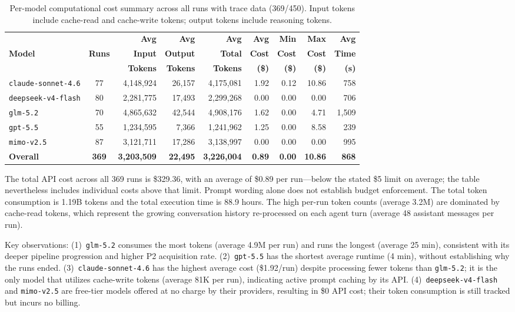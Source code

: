 \begin{table}[t]
\centering

\footnotesize
\renewcommand{\arraystretch}{1.1}
\setlength{\tabcolsep}{4pt}
\begin{tabular}{l c r r r r r r r}
\toprule
 & & \textbf{Avg} & \textbf{Avg} & \textbf{Avg} & \textbf{Avg} & \textbf{Min} & \textbf{Max} & \textbf{Avg} \\
\textbf{Model} & \textbf{Runs} & \textbf{Input} & \textbf{Output} & \textbf{Total} & \textbf{Cost} & \textbf{Cost} & \textbf{Cost} & \textbf{Time} \\
 & & \textbf{Tokens} & \textbf{Tokens} & \textbf{Tokens} & \textbf{(\$)} & \textbf{(\$)} & \textbf{(\$)} & \textbf{(s)} \\
\midrule
\texttt{claude-sonnet-4.6} & 77 & 4,148,924 & 26,157 & 4,175,081 & 1.92 & 0.12 & 10.86 & 758 \\
\texttt{deepseek-v4-flash} & 80 & 2,281,775 & 17,493 & 2,299,268 & 0.00 & 0.00 & 0.00 & 706 \\
\texttt{glm-5.2} & 70 & 4,865,632 & 42,544 & 4,908,176 & 1.62 & 0.00 & 4.71 & 1,509 \\
\texttt{gpt-5.5} & 55 & 1,234,595 & 7,366 & 1,241,962 & 1.25 & 0.00 & 8.58 & 239 \\
\texttt{mimo-v2.5} & 87 & 3,121,711 & 17,286 & 3,138,997 & 0.00 & 0.00 & 0.00 & 995 \\
\midrule
\textbf{Overall} & \textbf{369} & \textbf{3,203,509} & \textbf{22,495} & \textbf{3,226,004} & \textbf{0.89} & \textbf{0.00} & \textbf{10.86} & \textbf{868} \\
\bottomrule
\end{tabular}
\caption{Per-model computational cost summary across all runs with trace data (369/450). Input tokens include cache-read and cache-write tokens; output tokens include reasoning tokens.}
\label{tab:cost}
\end{table}

The total API cost across all 369 runs is \$329.36, with an average of \$0.89 per run---below the stated \$5 limit on average; the table nevertheless includes individual costs above that limit. Prompt wording alone does not establish budget enforcement. The total token consumption is 1.19B tokens and the total execution time is 88.9 hours. The high per-run token counts (average 3.2M) are dominated by cache-read tokens, which represent the growing conversation history re-processed on each agent turn (average 48 assistant messages per run).

Key observations: (1)~\texttt{glm-5.2} consumes the most tokens (average 4.9M per run) and runs the longest (average 25 min), consistent with its deeper pipeline progression and higher P2 acquisition rate. (2)~\texttt{gpt-5.5} has the shortest average runtime (4 min), without establishing why the runs ended. (3)~\texttt{claude-sonnet-4.6} has the highest average cost (\$1.92/run) despite processing fewer tokens than \texttt{glm-5.2}; it is the only model that utilizes cache-write tokens (average 81K per run), indicating active prompt caching by its API. (4)~\texttt{deepseek-v4-flash} and \texttt{mimo-v2.5} are free-tier models offered at no charge by their providers, resulting in \$0 API cost; their token consumption is still tracked but incurs no billing.



